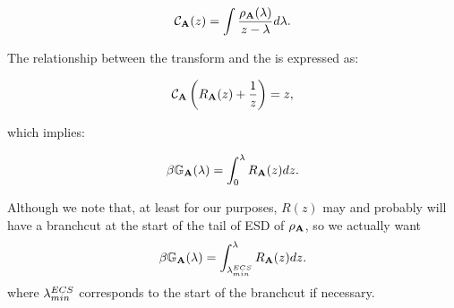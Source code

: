 \begin{equation}
\mathcal{C}_{\mathbf{A}}(z) = \int \frac{\rho_{\mathbf{A}}(\lambda)}{z - \lambda} d\lambda.
\end{equation}

The relationship between the \Cauchy transform and the \RTransform is expressed as:

\begin{equation}
\mathcal{C}_{\mathbf{A}}\left(R_{\mathbf{A}}(z) + \frac{1}{z}\right) = z,
\end{equation}

which implies:

\begin{equation}
\beta\mathbb{G}_{\mathbf{A}}(\lambda) = \int_0^{\lambda} R_{\mathbf{A}}(z) dz.
\end{equation}

Although we note that, at least for our purposes, $R(z)$ may and probably
will have a branchcut at the start of the tail of ESD of $\rho_{\mathbf{A}}$,
so we actually want
\begin{equation}
\beta\mathbb{G}_{\mathbf{A}}(\lambda) = \int_{\lambda^{ECS}_{min}}^{\lambda} R_{\mathbf{A}}(z) dz.
\end{equation}
where $\lambda^{ECS}_{min}$ corresponds to the start of the branchcut if necessary.







